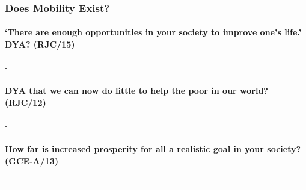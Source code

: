 \documentclass[../../main]{subfiles}
\begin{document}
\subsubsection{Does Mobility Exist?}

\paragraph{`There are enough opportunities in your society to improve one's life.' DYA? (RJC/15)}-

\paragraph{DYA that we can now do little to help the poor in our world? (RJC/12)}-

\paragraph{How far is increased prosperity for all a realistic goal in your society? (GCE-A/13)}-
\end{document}
